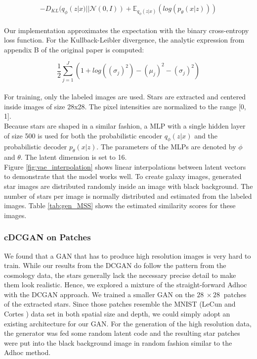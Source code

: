 \documentclass[10pt,conference,compsocconf]{IEEEtran}
\begin{document}
\[
-D_{KL}(q_{\phi}(z|x)||\mathcal{N}(0, I)) + \mathbb{E}_{q_{\phi}(z|x)}(log(p_{\theta}(x|z)))
\]
\\
Our implementation approximates the expectation with the binary cross-entropy loss function. For the Kullback-Leibler divergence, the analytic expression from appendix B of the original paper is computed:

\[
\frac{1}{2}\sum_{j=1}^J(1 + log((\sigma_{j})^{2}) - (\mu_{j})^{2} - (\sigma_{j})^{2})
\]
\\
For training, only the labeled images are used. Stars are extracted and centered inside images of size 28x28. The pixel intensities are normalized to the range [0, 1]. \\
Because stars are shaped in a similar fashion, a MLP with a single hidden layer of size 500 is used for both the probabilistic encoder $q_{\phi}(z|x)$ and the probabilistic decoder $p_{\theta}(x|z)$. The parameters of the MLPs are denoted by $\phi$ and $\theta$. The latent dimension is set to 16. \\
Figure \ref{fig:vae_interpolation} shows linear interpolations between latent vectors to demonstrate that the model works well. To create galaxy images, generated star images are distributed randomly inside an image with black background. The number of stars per image is normally distributed and estimated from the labeled images. Table \ref{tab:gen_MSS} shows the estimated similarity scores for these images.


\subsubsection{cDCGAN on Patches}
We found that a GAN that has to produce high resolution images is very hard to train. While our results from the DCGAN do follow the pattern from the cosmology data, the stars generally lack the necessary precise detail to make them look realistic. Hence, we explored a mixture of the straight-forward Adhoc with the DCGAN approach. We trained a smaller GAN on the $\SI{28}{}\times\SI{28}{}$ patches of the extracted stars. Since those patches resemble the MNIST (LeCun and Cortes \cite{lecun-mnisthandwrittendigit-2010}) data set in both spatial size and depth, we could simply adopt an existing architecture for our GAN. For the generation of the high resolution data, the generator was fed some random latent code and the resulting star patches were put into the black background image in random fashion similar to the Adhoc method.
\end{document}
